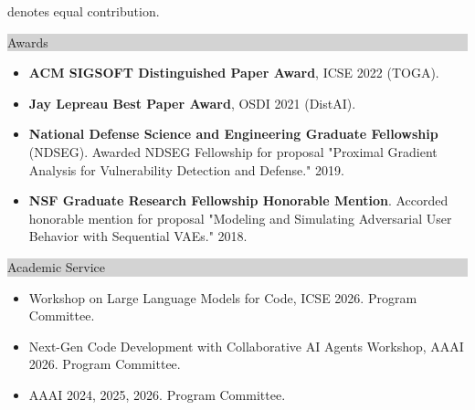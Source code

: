 \documentclass{article} %
\newcommand{\rsection}[1]{
  \hspace{-0.4cm}\vspace{0.1cm}
\colorbox{lightgrey}{
\begin{minipage}{1.07\linewidth}
\vspace{0.22cm}
\fontsize{14pt}{16pt}\selectfont #1
\vspace{0.12cm}
\end{minipage}
}
\vspace*{-0.1cm}
}
\begin{document}
\vspace{-0.1cm}
{\footnotesize * denotes equal contribution.}

\vspace{0.05cm}
\rsection{Awards}
\hspace*{-0.1cm}

\begin{minipage}{1.01\linewidth}
\begin{itemize}[label={},itemindent=-2em,leftmargin=2em,parsep=1pt,itemsep=0pt,topsep=3pt]
  \item {\bf ACM SIGSOFT Distinguished Paper Award}, ICSE 2022 (TOGA).
  \item {\bf Jay Lepreau Best Paper Award}, OSDI 2021 (DistAI).
  \item {\bf National Defense Science and Engineering Graduate Fellowship} (NDSEG). Awarded NDSEG Fellowship for proposal "Proximal Gradient Analysis for Vulnerability Detection and Defense." 2019.
  \item {\bf NSF Graduate Research Fellowship Honorable Mention}. Accorded honorable mention for proposal "Modeling and Simulating Adversarial User Behavior with Sequential VAEs." 2018.
  \end{itemize}
\end{minipage}

\vspace{0.05cm}

\rsection{Academic Service}
\hspace*{-0.1cm}
\begin{minipage}{1.01\linewidth}
\begin{itemize}[label={},itemindent=-2em,leftmargin=2em,parsep=1pt,itemsep=0pt,topsep=3pt]
  \item Workshop on Large Language Models for Code, ICSE 2026. Program Committee.
  \item Next-Gen Code Development with Collaborative AI Agents Workshop, AAAI 2026. Program Committee.
  \item AAAI 2024, 2025, 2026. Program Committee.
  \end{itemize}
\end{minipage}
\end{document}
